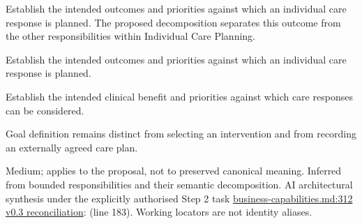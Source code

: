 Establish the intended outcomes and priorities against which an individual care response is planned. The proposed decomposition separates this outcome from the other responsibilities within Individual Care Planning.



Establish the intended outcomes and priorities against which an individual care response is planned.



Establish the intended clinical benefit and priorities against which care responses can be considered.



Goal definition remains distinct from selecting an intervention and from recording an externally agreed care plan.


Medium; applies to the proposal, not to preserved canonical meaning.
Inferred from bounded responsibilities and their semantic decomposition. AI architectural synthesis under the explicitly authorised Step 2 task \hyperref[evidence:a4c0900c47c945d9]{business-capabilities.md:312}
\hyperref[model:reconciliation]{v0.3 reconciliation}: \texttt{} (line 183). Working locators are not identity aliases.
